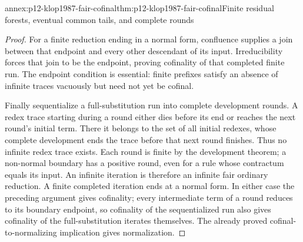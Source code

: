 \begin{annexitem}{annex:p12-klop1987-fair-cofinal}{thm:p12-klop1987-fair-cofinal}{Finite residual forests, eventual common tails, and complete rounds}
\begin{proof}
For a finite reduction ending in a normal form, confluence supplies a
join between that endpoint and every other descendant of its input.
Irreducibility forces that join to be the endpoint, proving cofinality
of that completed finite run. The endpoint condition is essential:
finite prefixes satisfy an absence of infinite traces vacuously but need
not yet be cofinal.

Finally sequentialize a full-substitution run into complete development
rounds. A redex trace starting during a round either dies before its
end or reaches the next round's initial term. There it belongs to the
set of all initial redexes, whose complete development ends the trace
before that next round finishes. Thus no infinite redex trace exists.
Each round is finite by the development theorem; a non-normal boundary
has a positive round, even for a rule whose contractum equals its input.
An infinite iteration is therefore an infinite fair ordinary reduction.
A finite completed iteration ends at a normal form. In either case the
preceding argument gives cofinality; every intermediate term of a round
reduces to its boundary endpoint, so cofinality of the sequentialized
run also gives cofinality of the full-substitution iterates themselves.
The already proved cofinal-to-normalizing implication gives normalization.
\end{proof}
\end{annexitem}

